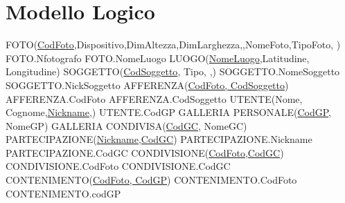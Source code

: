 \chapter{Modello Logico}

FOTO(\underline{CodFoto},Dispositivo,DimAltezza,DimLarghezza,\newline{},NomeFoto,TipoFoto, )
\newline
FOTO.Nfotografo
\newline
FOTO.NomeLuogo
\newline
\newline
LUOGO(\underline{NomeLuogo},Latitudine, Longitudine)
\newline
\newline
SOGGETTO(\underline{CodSoggetto}, Tipo, ,)
\newline
SOGGETTO.NomeSoggetto
\newline
SOGGETTO.NickSoggetto
\newline
\newline
AFFERENZA(\underline{CodFoto, CodSoggetto})
\newline
AFFERENZA.CodFoto
\newline
AFFERENZA.CodSoggetto
\newline
\newline
UTENTE(Nome, Cognome,\underline{Nickname},)
\newline
UTENTE.CodGP
\newline
\newline
GALLERIA PERSONALE(\underline{CodGP}, NomeGP)
\newline
\newline
GALLERIA CONDIVISA(\underline{CodGC}, NomeGC)
\newline
\newline
PARTECIPAZIONE(\underline{Nickname,CodGC})
\newline
PARTECIPAZIONE.Nickname
\newline
PARTECIPAZIONE.CodGC
\newline
\newline
CONDIVISIONE(\underline{CodFoto,CodGC})
\newline
CONDIVISIONE.CodFoto
\newline
CONDIVISIONE.CodGC
\newline
\newline
CONTENIMENTO(\underline{CodFoto, CodGP})
\newline
CONTENIMENTO.CodFoto
\newline
CONTENIMENTO.codGP
\newline

